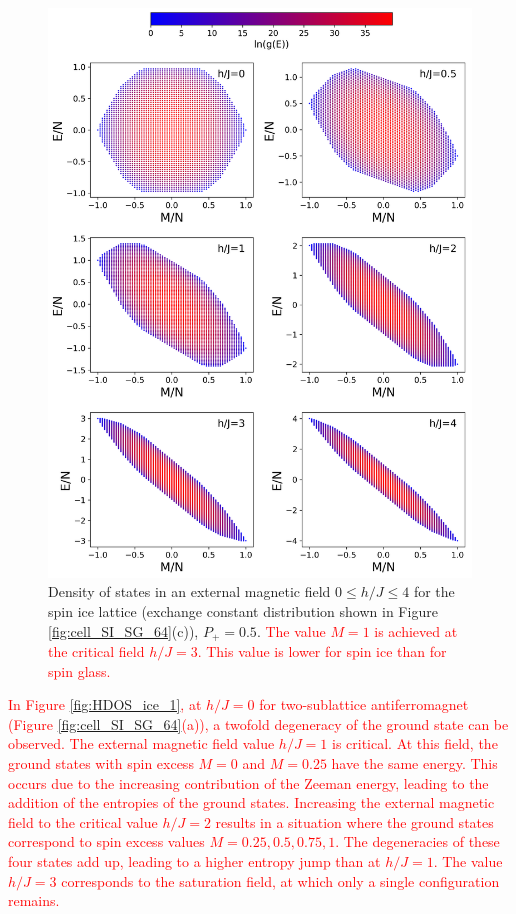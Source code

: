 \documentclass[preprint,12pt]{elsarticle}
\begin{document}
	
	\begin{figure}[H]
		\centering
		\includegraphics[width=1\linewidth]{pictures/HDOS_SI_64_J0.png}
		\caption{Density of states in an external magnetic field $0\leq h/J \leq 4$ for the spin ice lattice (exchange constant distribution shown in Figure \ref{fig:cell_SI_SG_64}(c)), $P_+ = 0.5$. \textcolor{red}{The value $M=1$ is achieved at the critical field $h/J=3$. This value is lower for spin ice than for spin glass.}}
		\label{fig:HDOS_ice}
	\end{figure}
	
	\textcolor{red}{In Figure \ref{fig:HDOS_ice_1}, at $h/J = 0$ for \textcolor{red}{two-sublattice antiferromagnet} (Figure \ref{fig:cell_SI_SG_64}(a)), a twofold degeneracy of the ground state can be observed. The external magnetic field value $h/J = 1$ is critical. At this field, the ground states with spin excess $M = 0$ and $M = 0.25$ have the same energy. This occurs due to the increasing contribution of the Zeeman energy, leading to the addition of the entropies of the ground states.  
	Increasing the external magnetic field to the critical value $h/J = 2$ results in a situation where the ground states correspond to spin excess values $M = 0.25, 0.5, 0.75, 1$. The degeneracies of these four states add up, leading to a higher entropy jump than at $h/J = 1$.  
	The value $h/J = 3$ corresponds to the saturation field, at which only a single configuration remains.}
	
\end{document}
